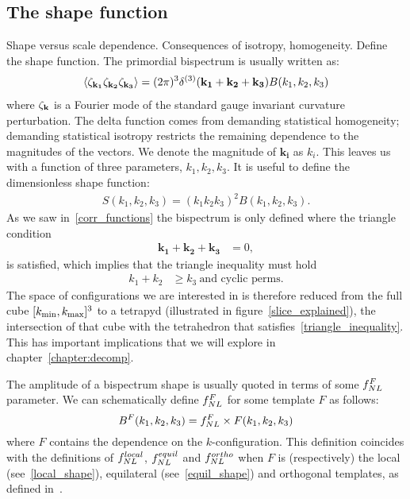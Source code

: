     \subsection{The shape function}
    Shape versus scale dependence.
    Consequences of isotropy, homogeneity.
    Define the shape function.
The primordial bispectrum is usually written as:
\begin{align}\label{bispectrum_definition}
{
\left< \zeta_{\bf{k_1}}\zeta_{\bf{k_2}}\zeta_{\bf{k_3}} \right>
= (2\pi)^3\delta^{(3)}(\mathbf{k_1}+\mathbf{k_2}+\mathbf{k_3})B(k_1,k_2,k_3)
}
\end{align}
where $\zeta_{\bf{k}}$ is a Fourier mode of the standard gauge invariant curvature perturbation.
The delta function comes from demanding statistical homogeneity;
demanding statistical isotropy restricts the remaining dependence to the magnitudes of the vectors.
We denote the magnitude of $\mathbf{k_i}$ as $k_i$.
This leaves us with a function of three parameters,
$k_1,k_2,k_3$.
It is useful to define the dimensionless shape function:
\begin{align}\label{shapefn}
{
    S(k_1,k_2,k_3) = (k_1k_2k_3)^2B(k_1,k_2,k_3).
}
\end{align}
As we saw in~\ref{corr_functions}
the bispectrum is only defined where the triangle condition
\begin{align}\label{triangle_condition}
    \mathbf{k_1}+\mathbf{k_2}+\mathbf{k_3} &= 0,
\end{align}
is satisfied, which implies that the triangle inequality must hold
\begin{align}\label{triangle_inequality}
    k_1+k_2 &\geq k_3~\text{and cyclic perms}.
\end{align}
The space of configurations we are interested in is therefore
reduced from the full cube $[{k_\text{min}},{k_\text{max}}]^3$
to a tetrapyd (illustrated in figure~\ref{slice_explained}),
the intersection of that cube with the
tetrahedron that satisfies~\eqref{triangle_inequality}.
This has important implications that we will explore in
chapter~\ref{chapter:decomp}. 


The amplitude of a bispectrum shape is usually
quoted in terms of some $f_{NL}^F$ parameter.
We can schematically define $f_{NL}^F$ for some template $F$ as follows:
\begin{equation}\label{def:fnl}
{
B^{F}(k_1,k_2,k_3) = f_{NL}^{F}\times F(k_1,k_2,k_3)
}
\end{equation}
where $F$ contains the dependence on the $k$-configuration.
This definition coincides with the definitions of
$f^{local}_{NL}$, $f^{equil}_{NL}$ and $f^{ortho}_{NL}$
when $F$ is (respectively) the local (see~\eqref{local_shape}),
equilateral (see~\eqref{equil_shape}) and orthogonal templates,
as defined in~\cite{Planck_NG_2013, Planck_NG_2015}.

